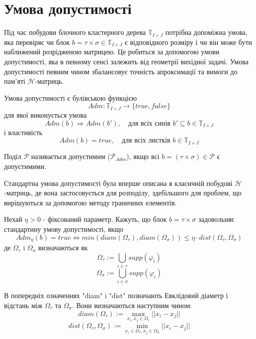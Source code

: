 \documentclass[12pt]{report}
\begin{document}
	\section{Умова допустимості}
	\hspace{0.8cm} Під час побудови блочного кластерного дерева $\mathbb{T}_{I\times J}$ потрібна допоміжна умова, яка перевіряє чи блок $b=\tau\times\sigma\in \mathbb{T}_{I\times J}$ є відповідного розміру і  чи він може бути наближений розрідженою матрицею. Це робиться за допомогою умови допустимості, яка в певному сенсі залежить від геометрії вихідної задачі. Умова допустимості певним чином збалансовує точність апроксимації та вимоги до пам'яті $\mathcal{H}$-матриць.
	\begin{Def}
	Умова допустимості є булівською функцією 
	$$Adm:\mathbb{T}_{I\times J}\rightarrow\{true,false\}$$
	для якої виконується умова
	$$Adm(b)\Rightarrow Adm(b'),\quad\text{для всіх синів } b'\subseteq b\in \mathbb{T}_{I\times J} $$
	і властивість\newline 
	\hspace{2cm}$$Adm(b)=true, \quad\text{для всіх листків } b\in \mathbb{T}_{I\times J}$$
	\end{Def}
	\begin{Def}
		Поділ $\mathcal{P}$ називається допустимим ($\mathcal{P}_{Adm}$), якщо всі $b=(\tau\times\sigma)\in \mathcal{P}$ є допустимими.
	\end{Def}
	\hspace{0.8cm} Стандартна умова допустимості була вперше описана в класичній побудові $\mathcal{H}$-матриць, де вона застосовується для розподілу, здебільшого для проблем, що вирішуються за допомогою методу граничних елементів.
	\begin{Def}
	Нехай $\eta>0$ - фіксований параметр. Кажуть, що блок $b=\tau\times\sigma$ задовольняє стандартину умову допустимості, якщо 
	$$Adm_\eta(b)=true\Leftrightarrow min(diam(\Omega_{\tau}),diam(\Omega_{\sigma}))\le \eta\cdot dist(\Omega_{\tau},\Omega_{\sigma})$$
	де $\Omega_{\tau}$ i $\Omega_{\sigma}$ визначаються як
	$$\Omega_{\tau}:=\bigcup_{i\in \tau}supp(\varphi_i)$$
	$$\Omega_{\sigma}:=\bigcup_{i\in \sigma}supp(\varphi_i)$$
	\end{Def}
	\par В попередніх означеннях "diam" i "dist" позначають Евклідовий діаметр і відстань між $\Omega_{\tau}$ та $\Omega_{\sigma}$. Вони визначаються наступним чином:
	$$diam(\Omega_{\tau}):=\max_{x_i,x_j\in\Omega_{\tau}}||x_i-x_j||$$
	$$dist(\Omega_{\tau},\Omega_{\sigma}):=\min_{x_i\in\Omega_{\tau},x_j\in\Omega_{\sigma}}||x_i-x_j||$$
\end{document}
